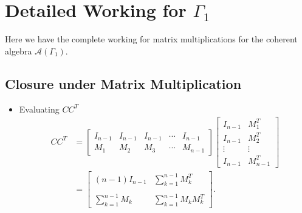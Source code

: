 \appendix

\renewcommand{\thepage}{A\arabic{page}}
\setcounter{page}{1}
\section{Detailed Working for \texorpdfstring{$\Gamma_1$}{Gamma 1}}

Here we have the complete working for matrix multiplications for the coherent algebra $\mathcal{A}(\Gamma_1)$.

\subsection*{Closure under Matrix Multiplication}\label{working:gamma-1}
\begin{itemize}
    \item Evaluating $CC^T$
    \begin{align*}
        CC^T &=
        \begin{bmatrix}
            I_{n-1} & I_{n-1} & I_{n-1} & \cdots & I_{n-1} \\
            M_1 & M_2 & M_3 & \cdots & M_{n-1}
        \end{bmatrix} 
        \begin{bmatrix}
            I_{n-1} & M_1^T \\
            I_{n-1} & M_2^T \\
            \vdots & \vdots \\
            I_{n-1} & M_{n-1}^T
        \end{bmatrix} \\
        &= 
        \begin{bmatrix}
            (n-1)I_{n-1} & \sum_{k=1}^{n-1} M_k^T \\ \\
            \sum^{n-1}_{k=1}M_k & \sum_{k=1}^{n-1}M_kM_k^T
        \end{bmatrix}.
    \end{align*}
    

\end{itemize}
